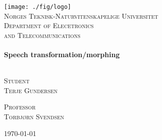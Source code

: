 \begin{titlepage}
 
\begin{center}
 
 
\texttt{[image: ./fig/logo]}\\[1cm]
 
\textsc{\LARGE Norges Teknisk-Naturvitenskapelige Universitet}\\[1.5cm]
 
\textsc{\large Department of Elecetronics \\ and Telecommunications }\\[0.5cm]
 
 
\HRule \\[0.4cm]
{ \huge \bfseries Speech transformation/morphing}\\[0.4cm]
 
\HRule \\[1.5cm]
 
\begin{minipage}{0.45\textwidth}
	\begin{flushleft} \large
		\textsc{Student \\ Terje Gundersen}
	\end{flushleft}
\end{minipage}
\begin{minipage}{0.45\textwidth}
	\begin{flushright} \large
		\textsc{Professor \\ Torbjørn Svendsen}
	\end{flushright}
\end{minipage}
 
\vfill
 
{\large \today}
 
\end{center}
 
\end{titlepage}
